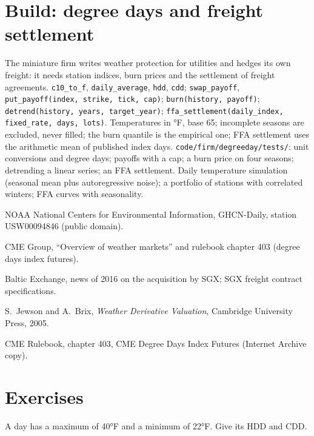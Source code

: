 \section{Build: degree days and freight settlement}\label{bld:m3:freight-weather-and-other-corners:degreeday}

\begin{build}
 The miniature firm writes weather protection for utilities and hedges its own freight:
it needs station indices, burn prices and the settlement of freight agreements.
 \texttt{c10\_to\_f}, \texttt{daily\_average}, \texttt{hdd}, \texttt{cdd};
\texttt{swap\_payoff}, \texttt{put\_payoff(index, strike, tick, cap)}; \texttt{burn(history, payoff)};
\texttt{detrend(history, years, target\_year)}; \texttt{ffa\_settlement(daily\_index, fixed\_rate, days,
lots)}.
 Temperatures in °F, base 65; incomplete seasons are excluded, never filled; the burn
quantile is the empirical one; FFA settlement uses the arithmetic mean of published index days.
 \texttt{code/firm/degreeday/tests/}: unit conversions and degree days; payoffs
with a cap; a burn price on four seasons; detrending a linear series; an FFA settlement.
 Daily temperature simulation (seasonal mean plus autoregressive noise); a portfolio of
stations with correlated winters; FFA curves with seasonality.
\end{build}

\begin{omsources}
\item NOAA National Centers for Environmental Information, GHCN-Daily, station USW00094846 (public domain).
\item CME Group, ``Overview of weather markets'' and rulebook chapter 403 (degree days index futures).
\item Baltic Exchange, news of 2016 on the acquisition by SGX; SGX freight contract specifications.
\item S.~Jewson and A.~Brix, \emph{Weather Derivative Valuation}, Cambridge University Press, 2005.
\item CME Rulebook, chapter 403, CME Degree Days Index Futures (Internet Archive copy).
\end{omsources}

\section{Exercises}

\begin{exercise}[$\star$]\label{exo:m3:freight-weather-and-other-corners:1}
A day has a maximum of 40°F and a minimum of 22°F. Give its HDD and CDD.
\end{exercise}

